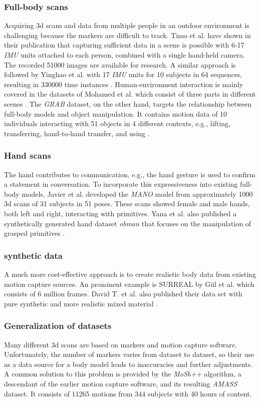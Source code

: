 \subsubsection{Full-body scans}
Acquiring 3d scans and data from multiple people in an outdoor environment is challenging because the markers are difficult to track. Timo et al. have shown in their publication that capturing sufficient data in a scene is possible with 6-17 \emph{IMU} units attached to each person, combined with a single hand-held camera. The recorded 51000 images are available for research.\cite{vip} A similar approach is followed by Yinghao et al. with 17 \emph{IMU} units for 10 subjects in 64 sequences, resulting in 330000 time instances \cite{dip}. Human-environment interaction is mainly covered in the datasets of Mohamed et al. which consist of three parts in different scenes \cite{prox}. The \emph{GRAB} dataset, on the other hand, targets the relationship between full-body models and object manipulation. It contains motion data of 10 individuals interacting with 51 objects in 4 different contexts, e.g., lifting, transferring, hand-to-hand transfer, and using \cite{grab}.

\subsubsection{Hand scans}
The hand contributes to communication, e.g., the hand gesture is used to confirm a statement in conversation. To incorporate this expressiveness into existing full-body models, Javier et al. developed the \emph{MANO} model from approximately 1000 3d scans of 31 subjects in 51 poses. These scans showed female and male hands, both left and right, interacting with primitives. \cite{mano} 
Yana et al. also published a synthetically generated hand dataset \emph{obman} that focuses on the manipulation of grasped primitives \cite{obman}.

\subsubsection{synthetic data}
A much more cost-effective approach is to create realistic body data from existing motion capture sources. An prominent example is SURREAL by Gül et al. which consists of 6 million frames\cite{surreal}. David T. et al. also published their data set with pure synthetic and more realistic mixed material \cite{ltsh}.

\subsubsection{Generalization of datasets}
Many different 3d scans are based on markers and motion capture software. Unfortunately, the number of markers varies from dataset to dataset, so their use as a data source for a body model leads to inaccuracies and further adjustments. A common solution to this problem is provided by the \emph{MoSh++} algorithm, a descendant of the earlier motion capture software, and its resulting \emph{AMASS} dataset. It consists of 11265 motions from 344 subjects with 40 hours of content.\cite{amass}
\cite{mpii}